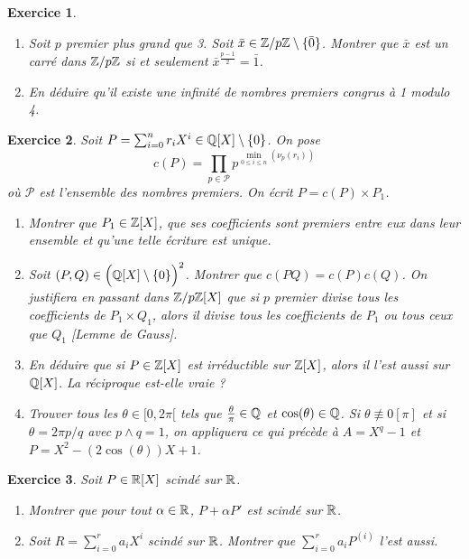\documentclass[12pt]{article}
\newtheorem{exercise}{Exercice}[section]
\theoremstyle{remark}
\theoremstyle{remark}
\begin{document}
\begin{exercise}
	\phantom{}
	\begin{enumerate}
		\item
		Soit $p$ premier plus grand que 3. Soit
		$\bar{x}\in\mathbb{Z}/p\mathbb{Z}\setminus\{\bar{0}\}$. Montrer que $\bar{x}$ est un carré
		dans $\mathbb{Z}/p\mathbb{Z}$ si et seulement $\bar{x}^{\frac{p-1}{2}}=\bar{1}$.
		\item
		En déduire qu'il existe une infinité de nombres premiers congrus à 1
		modulo 4.
	\end{enumerate}
\end{exercise}

\begin{exercise}
	Soit $P=\sum_{i=0}^{n}r_{i}X^{i}\in\mathbb{Q}[X]\setminus\{0\}$. On pose
	$$c(P)=\prod_{p\in\mathcal{P}}p^{\min\limits_{0\leqslant i\leqslant
	n}(\nu_{p}(r_{i}))}$$ où $\mathcal{P}$ est l'ensemble des nombres premiers. On
	écrit $P=c(P)\times P_{1}$.
	\begin{enumerate}
		\item
		Montrer que $P_{1}\in\mathbb{Z}[X]$, que ses coefficients sont premiers entre eux
		dans leur ensemble et qu'une telle écriture est unique.
		\item
		Soit $(P,Q)\in \Bigl(\mathbb{Q}[X]\setminus\{0\}\Bigr)^{2}$. Montrer que
		$c(PQ)=c(P)c(Q)$. On justifiera en passant dans $\mathbb{Z}/p\mathbb{Z}[X]$ que si $p$
		premier divise tous les coefficients de $P_{1}\times Q_{1}$, alors il
		divise tous les coefficients de $P_{1}$ ou tous ceux que $Q_{1}$ [Lemme de
		Gauss].
		\item
		En déduire que si $P\in\mathbb{Z}[X]$ est irréductible sur $\mathbb{Z}[X]$, alors il l'est
		aussi sur $\mathbb{Q}[X]$. La réciproque est-elle vraie ?
		\item
		Trouver tous les $\theta\in[0,2\pi[$ tels que $\frac{\theta}{\pi}\in\mathbb{Q}$ et
		$\cos(\theta)\in\mathbb{Q}$. Si $\theta\not\equiv0[\pi]$ et si $\theta=2\pi p/q$
		avec $p\wedge q=1$, on appliquera ce qui précède à $A=X^{q}-1$ et
		$P=X^{2}-(2\cos(\theta))X+1$.
	\end{enumerate}
\end{exercise}

\begin{exercise}
	Soit $P\in\mathbb{R}[X]$ scindé sur $\mathbb{R}$.
	\begin{enumerate}
		\item
		Montrer que pour tout $\alpha\in\mathbb{R}$, $P+\alpha P'$ est scindé sur $\mathbb{R}$.
		\item
		Soit $R=\sum_{i=0}^{r}a_{i}X^{i}$ scindé sur $\mathbb{R}$. Montrer que
		$\sum_{i=0}^{r}a_{i}P^{(i)}$ l'est aussi.
	\end{enumerate}
\end{exercise}
\end{document}
